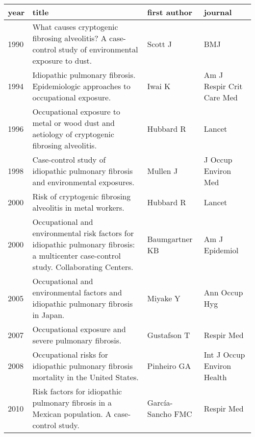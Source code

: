 \documentclass[a4paper,12pt]{article}
\begin{document}
\begin{table}
    \begin{tabular}{lp{6cm}ll}
    \textbf{year} & \textbf{title} &      \textbf{first author} &        \textbf{journal} \\
    \midrule
    1990    &   What causes cryptogenic fibrosing alveolitis? A case-control study of environmental exposure to dust. &                    Scott J &                         BMJ \\
    1994    &                                                        Idiopathic pulmonary fibrosis. Epidemiologic approaches to occupational exposure. &                     Iwai K &   Am J Respir Crit Care Med \\
    1996    &                                           Occupational exposure to metal or wood dust and aetiology of cryptogenic fibrosing alveolitis. &                  Hubbard R &                      Lancet \\
    1998    &                                                         Case-control study of idiopathic pulmonary fibrosis and environmental exposures. &                   Mullen J &         J Occup Environ Med \\
    2000    &                                                                               Risk of cryptogenic fibrosing alveolitis in metal workers. &                  Hubbard R &                      Lancet \\
    2000    &  Occupational and environmental risk factors for idiopathic pulmonary fibrosis: a multicenter case-control study. Collaborating Centers. &             Baumgartner KB &              Am J Epidemiol \\
    2005    &                                                       Occupational and environmental factors and idiopathic pulmonary fibrosis in Japan. &                   Miyake Y &               Ann Occup Hyg \\
    2007    &                                                                                     Occupational exposure and severe pulmonary fibrosis. &                Gustafson T &                  Respir Med \\
    2008    &                                                     Occupational risks for idiopathic pulmonary fibrosis mortality in the United States. &                Pinheiro GA &  Int J Occup Environ Health \\
    2010    &                                            Risk factors for idiopathic pulmonary fibrosis in a Mexican population. A case-control study. &  García-Sancho FMC &                  Respir Med \\

\end{tabular}
\end{table}
\end{document}
